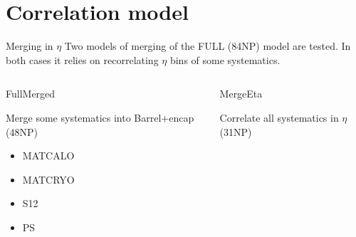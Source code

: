 \documentclass[bigger]{beamer}
\author{Christophe Goudet}
\date{\today}
\title{}
\begin{document}
\section{Correlation model}
\label{sec:org958366e}
\begin{frame}[label={sec:org44f2794}]{Merging in \(\eta\)}
Two models of merging of the FULL (84NP) model are tested.
In both cases it relies on recorrelating \(\eta\) bins of some systematics.

\vfill

\begin{columns}
\begin{column}{0.5\columnwidth}
\alert{FullMerged}

Merge some systematics into Barrel+encap (48NP)
\begin{itemize}
\item MATCALO
\item MATCRYO
\item S12
\item PS
\end{itemize}
\end{column}

\begin{column}{0.5\columnwidth}
\alert{MergeEta}

Correlate all systematics in \(\eta\) (31NP)
\end{column}
\end{columns}
\end{frame}
\end{document}
